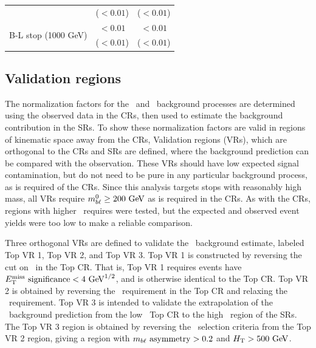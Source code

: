 \begin{table}
{\begin{tabular}{c|cc}
                                           & ($< 0.01$)                        & ($< 0.01$) \vspace{1ex}           \\
      \multirow{2}{*}{B-L stop (1000 GeV)} & $< 0.01$                          & $< 0.01$                          \\
                                           & ($< 0.01$)                        & ($< 0.01$) \vspace{1ex}           \\
      \bottomrule
    \end{tabular}
  }
\end{table}

\FloatBarrier
\subsection{Validation regions}
\label{sec:vr}

The normalization factors for the \TTBAR\ and \ZGAMMAJETS\ background processes
are determined using the observed data in the CRs, then used to estimate the
background contribution in the SRs.
To show these normalization factors are valid in regions of kinematic space away
from the CRs, Validation regions (VRs), which are orthogonal to the CRs and SRs
are defined, where the background prediction can be compared with the
observation.
These VRs should have low expected signal contamination, but do not need to be
pure in any particular background process, as is required of the CRs.
Since this analysis targets stops with reasonably high mass, all VRs require
$\MBL^0 \geq 200 \GeV$ as is required in the CRs.
As with the CRs, regions with higher \MBL\ requires were tested, but the
expected and observed event yields were too low to make a reliable comparison.

Three orthogonal VRs are defined to validate the \TTBAR\ background estimate,
labeled Top VR 1, Top VR 2, and Top VR 3.
Top VR 1 is constructed by reversing the cut on \METSIG\ in the Top CR.
That is, Top VR 1 requires events have $\METSIG < 4 \GeV^{1/2}$, and is
otherwise identical to the Top CR.
Top VR 2 is obtained by reversing the \MBLASYM\ requirement in the Top CR and
relaxing the \METSIG\ requirement.
Top VR 3 is intended to validate the extrapolation of the \TTBAR\ background
prediction from the low \HT\ Top CR to the high \HT\ region of the SRs.
The Top VR 3 region is obtained by reversing the \HT\ selection criteria from
the Top VR 2 region, giving a region with $m_{b\ell}~\mathrm{asymmetry} > 0.2$ and $\HT > 500 \GeV$.

